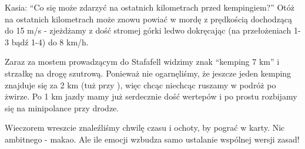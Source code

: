 Kasia: “Co się może zdarzyć na ostatnich kilometrach przed kempingiem?” Otóż na ostatnich kilometrach może znowu powiać w mordę z prędkością dochodzącą do 15 m/s - zjeżdżamy z dość stromej górki ledwo dokręcając (na przełożeniach 1-3 bądź 1-4) do 8 km/h.

Zaraz za mostem prowadzącym do Stafafell widzimy znak “kemping 7 km” i strzałkę na drogę szutrową. Ponieważ nie ogarnęliśmy, że jeszcze jeden kemping znajduje się za 2 km (tuż przy ), więc chcąc niechcąc ruszamy w podróż po żwirze. Po 1 km jazdy mamy już serdecznie dość wertepów i po prostu rozbijamy się na minipolance przy drodze.

Wieczorem wreszcie znaleźliśmy chwilę czasu i ochoty, by pograć w karty. Nic ambitnego - makao. Ale ile emocji wzbudza samo ustalanie wspólnej wersji zasad!

